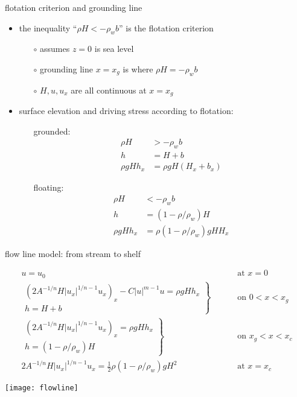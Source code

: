 \begin{frame}{flotation criterion and grounding line}

\begin{itemize}
\item the inequality ``$\rho H < - \rho_w b$'' is the \alert{flotation criterion}
  \begin{itemize}
  \item[$\circ$] assumes $z=0$ is sea level
  \item[$\circ$] grounding line $x=x_g$ is where $\rho H = - \rho_w b$
  \item[$\circ$] $H,u,u_x$ are all continuous at $x=x_g$
  \end{itemize}
\item surface elevation and driving stress according to flotation:
  \begin{itemize}
  \item[grounded:]
\begin{align*}
\rho H &> - \rho_w b \\
h &= H + b \\
\rho g H h_x &= \rho g H (H_x + b_x)
\end{align*}
  \item[floating:]
\begin{align*}
\rho H &< - \rho_w b \\
h &= (1-\rho/\rho_w) H \\
\rho g H h_x &= \rho(1-\rho/\rho_w) g H H_x
\end{align*}  
  \end{itemize}
\end{itemize}
\end{frame}


\begin{frame}{flow line model: from stream to shelf}
\label{slide:streamtoshelf}

\small
\begin{align*}
  u = u_0 & \qquad \text{ at } x = 0 \\
  \left.\begin{array}{r}
  \left(2 A^{-1/n} H |u_x|^{1/n - 1} u_x\right)_x - C|u|^{m-1}u = \rho g H h_x \\
  h = H + b
  \end{array}\right\}& \qquad \text{ on } 0 < x < x_g \\
  \left.\begin{array}{r}
  \left(2 A^{-1/n} H |u_x|^{1/n - 1} u_x\right)_x = \rho g H h_x \\
  h = (1-\rho/\rho_w) H
  \end{array}\right\}& \qquad \text{ on } x_g < x < x_c \\
  2 A^{-1/n} H |u_x|^{1/n - 1} u_x = \frac{1}{2}\rho (1-\rho/\rho_w) g H^2 & \qquad \text{ at } x = x_c
\end{align*}

\bigskip\bigskip
\begin{center}
  \texttt{[image: flowline]}
\end{center}
\end{frame}


